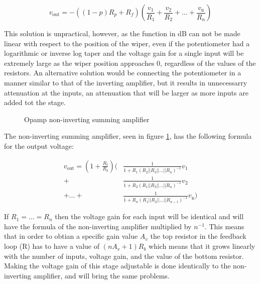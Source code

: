 \begin{equation}
    v_\text{out} = -((1-p)R_p + R_f) (\frac{v_\text{1}}{R_1} +
                         \frac{v_\text{2}}{R_2} + ... +
                         \frac{v_\text{n}}{R_n})
\end{equation}

This solution is unpractical, however, as the function in dB can not be made
linear with respect to the position of the wiper, even if the potentiometer had
a logarithmic or inverse log taper and the voltage gain for a single input will
be extremely large as the wiper position approaches 0, regardless of the values
of the resistors. An alternative solution would be connecting the potentiometer
in a manner similar to that of the inverting amplifier, but it results in
unnecessarry attenuation at the inputs, an attenuation that will be larger as
more inputs are added tot the stage.

\begin{figure}[H]
    \center
    
    \caption{Opamp non-inverting summing amplifier}
    \label{fig:sumamp}
\end{figure}

The non-inverting summing amplifier, seen in figure \ref{fig:sumamp}, has the
following formula for the output voltage:

\begin{equation}
    \begin{split}
    v_\text{out} = (1+\frac{R_t}{R_b})
        (&\frac{1}{1 + R_1 (R_2 || R_3 || ... || R_n)^{-1}} v_\text{1}
      \\+&\frac{1}{1 + R_2 (R_1 || R_3 || ... || R_n)^{-1}} v_\text{2}
  \\+...+&\frac{1}{1 + R_n (R_1 || R_2 || ... || R_{n-1})^{-1}} v_\text{n} )
    \end{split}
\end{equation}

If $R_1 = ... = R_n$ then the voltage gain for each input will be identical and
will have the formula of the non-inverting amplifier multiplied by $n^{-1}$.
This means that in order to obtian a specific gain value $A_v$ the top resistor
in the feedback loop (R) has to have a value of $(nA_v+1)R_b$ which
means that it grows linearly with the number of inputs, voltage gain, and the
value of the bottom resistor.
Making the voltage gain of this stage adjustable is done identically to the
non-inverting amplifier, and will bring the same problems.

